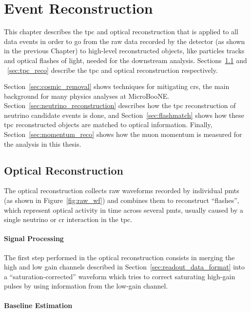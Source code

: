\chapter{Event Reconstruction}
\label{ch:reconstruction}



This chapter describes the \acrshort{tpc} and optical reconstruction that is applied to all data events in order to go from the raw data recorded by the detector (as shown in the previous Chapter) to high-level reconstructed objects, like particles tracks and optical flashes of light, needed for the downstream analysis.
Sections~\ref{sec:optical_reco} and ~\ref{sec:tpc_reco} describe the \acrshort{tpc} and optical reconstruction respectively.

Section~\ref{sec:cosmic_removal} shows techniques for mitigating \acrshort{cr}s, the main background for many physics analyses at MicroBooNE. Section~\ref{sec:neutrino_reconstruction} describes how the \acrshort{tpc} reconstruction of neutrino candidate events is done, and Section~\ref{sec:flashmatch} shows how these \acrshort{tpc} reconstructed objects are matched to optical information.
Finally, Section~\ref{sec:momentum_reco} shows how the muon momentum is measured for the analysis in this thesis.



\section{Optical Reconstruction}
\label{sec:optical_reco}

The optical reconstruction collects raw waveforms recorded by individual \acrshort{pmt}s (as shown in Figure~\ref{fig:raw_wf}) and combines them to reconstruct ``flashes'', which represent optical activity in time across several \acrshort{pmt}s, usually caused by a single neutrino or \acrshort{cr} interaction in the \acrshort{tpc}. 

\subsubsection*{Signal Processing}

The first step performed in the optical reconstruction consists in merging the high and low gain channels described in Section~\ref{sec:readout_data_format} into a ``saturation-corrected'' waveform which tries to correct saturating high-gain pulses by using information from the low-gain channel.

\subsubsection*{Baseline Estimation}

